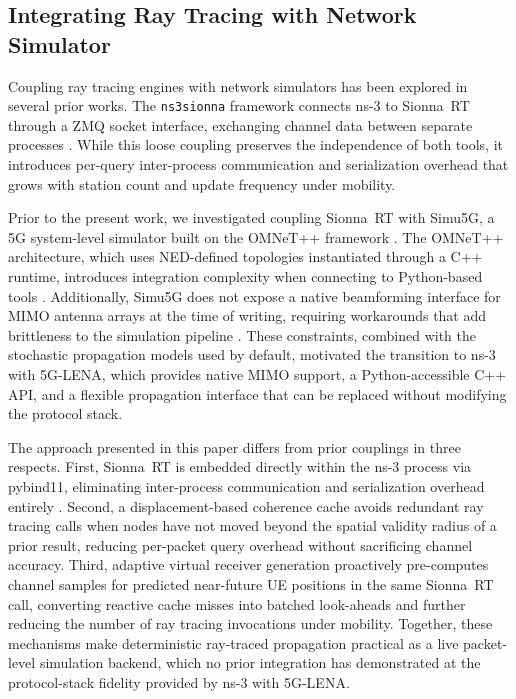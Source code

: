 \subsection{Integrating Ray Tracing with Network Simulator}
Coupling ray tracing engines with network simulators has been explored in several prior works.
The \texttt{ns3sionna} framework connects ns-3 to Sionna~RT through a ZMQ socket interface, exchanging channel data between separate processes \cite{ns3sionna}.
While this loose coupling preserves the independence of both tools, it introduces per-query inter-process communication and serialization overhead that grows with station count and update frequency under mobility.

Prior to the present work, we investigated coupling Sionna~RT with Simu5G, a 5G system-level simulator built on the OMNeT++ framework \cite{simu5g,omnet}.
The OMNeT++ architecture, which uses NED-defined topologies instantiated through a C++ runtime, introduces integration complexity when connecting to Python-based tools \cite{omnet,simu5g}.
Additionally, Simu5G does not expose a native beamforming interface for MIMO antenna arrays at the time of writing, requiring workarounds that add brittleness to the simulation pipeline \cite{simu5g}.
These constraints, combined with the stochastic propagation models used by default, motivated the transition to ns-3 with 5G-LENA, which provides native MIMO support, a Python-accessible C++ API, and a flexible propagation interface that can be replaced without modifying the protocol stack.

The approach presented in this paper differs from prior couplings in three respects.
First, Sionna~RT is embedded directly within the ns-3 process via pybind11, eliminating inter-process communication and serialization overhead entirely \cite{pybind11}.
Second, a displacement-based coherence cache avoids redundant ray tracing calls when nodes have not moved beyond the spatial validity radius of a prior result, reducing per-packet query overhead without sacrificing channel accuracy.
Third, adaptive virtual receiver generation proactively pre-computes channel samples for predicted near-future UE positions in the same Sionna~RT call, converting reactive cache misses into batched look-aheads and further reducing the number of ray tracing invocations under mobility.
Together, these mechanisms make deterministic ray-traced propagation practical as a live packet-level simulation backend, which no prior integration has demonstrated at the protocol-stack fidelity provided by ns-3 with 5G-LENA.